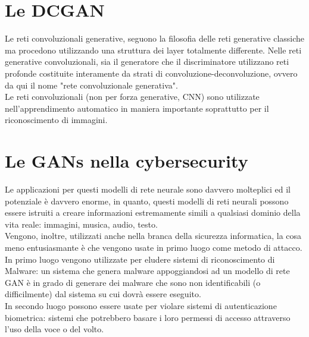 \section{Le DCGAN}
Le reti convoluzionali generative, seguono la filosofia delle reti generative classiche ma procedono utilizzando una struttura dei layer totalmente differente. Nelle reti generative convoluzionali, sia il generatore che il discriminatore utilizzano reti profonde costituite interamente da strati di convoluzione-deconvoluzione, ovvero da qui il nome "rete convoluzionale generativa".\\
Le reti convoluzionali (non per forza generative, CNN) sono utilizzate nell'apprendimento automatico in maniera importante soprattutto per il riconoscimento di immagini.

\section{Le GANs nella cybersecurity}
Le applicazioni\cite{9298135} per questi modelli di rete neurale sono davvero molteplici ed il potenziale è davvero enorme, in quanto, questi modelli di reti neurali possono essere istruiti a creare informazioni estremamente simili a qualsiasi dominio della vita reale: immagini, musica, audio, testo.\\
Vengono, inoltre, utilizzati anche nella branca della sicurezza informatica, la cosa meno entusiasmante è che vengono usate in primo luogo come metodo di attacco.\\
In primo luogo vengono utilizzate per eludere sistemi di riconoscimento di Malware: un sistema che genera malware appoggiandosi ad un modello di rete GAN è in grado di generare dei malware che sono non identificabili (o difficilmente) dal sistema su cui dovrà essere eseguito.\\
In secondo luogo possono essere usate per violare sistemi di autenticazione biometrica: sistemi che potrebbero basare i loro permessi di accesso attraverso l'uso della voce o del volto.

